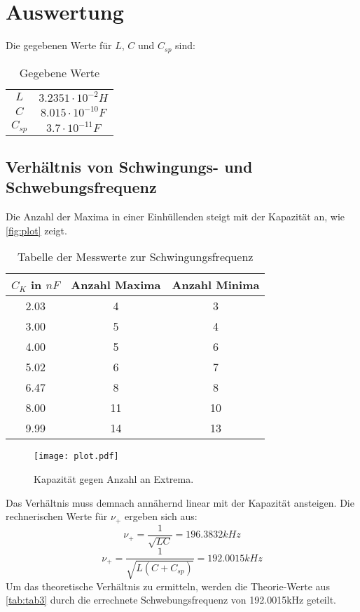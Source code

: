 \newpage
\section{Auswertung}
\label{sec:Auswertung}

Die gegebenen Werte für \(L\), \(C\) und \(C_{sp}\) sind:
\begin{table}
  \centering
  \caption{Gegebene Werte}
  \label{tab:tab}
  \begin{tabular}{c c}
    \midrule
    \(L\) & \(3.2351\cdot10^{-2} H\)\\
    \(C\) & \(8.015\cdot10^{-10} F\)\\
    \(C_{sp}\) & \(3.7\cdot10^{-11} F\)\\
    \bottomrule
  \end{tabular}
\end{table}

\subsection{Verhältnis von Schwingungs- und Schwebungsfrequenz}
Die Anzahl der Maxima in einer Einhüllenden steigt mit der Kapazität an, wie \autoref{fig:plot} zeigt.
\begin{table}
  \centering
  \caption{Tabelle der Messwerte zur Schwingungsfrequenz}
  \label{tab:tab1}
  \begin{tabular}{c c c}
    \toprule
    \(C_K\) in $nF$ & Anzahl Maxima & Anzahl Minima\\
    \midrule
    2.03 & 4 & 3\\
    3.00 & 5 & 4\\
    4.00 & 5 & 6\\
    5.02 & 6 & 7\\
    6.47 & 8 & 8\\
    8.00 & 11 & 10\\
    9.99 & 14 & 13\\
    \bottomrule
  \end{tabular}
\end{table}

\begin{figure}
  \centering
  \texttt{[image: plot.pdf]}
  \caption{Kapazität gegen Anzahl an Extrema.}
  \label{fig:plot}
\end{figure}
\newpage
Das Verhältnis muss demnach annähernd linear mit der Kapazität ansteigen.
Die rechnerischen Werte für \(\nu_+\) ergeben sich aus:
\begin{equation}
  \nu_+ = \frac{1}{\sqrt{LC}} = 196.3832kHz
\end{equation}
\begin{equation}
  \nu_+ = \frac{1}{\sqrt{L(C+C_{sp})}} = 192.0015kHz
\end{equation}
Um das theoretische Verhältnis zu ermitteln, werden die Theorie-Werte aus \autoref{tab:tab3} durch die errechnete Schwebungsfrequenz von 192.0015kHz geteilt.

